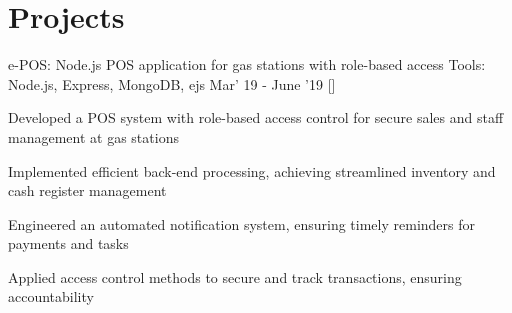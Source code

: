 











\section{\textbf{Projects}}
\vspace{-0.4mm}
\resumeSubHeadingListStart

\resumeProject
  {e-POS: Node.js POS application for gas stations with role-based access}
  {Tools: Node.js, Express, MongoDB, ejs}
  {Mar' 19 - June '19}
  {{}[\href{https://github.com/shakkhor/e-pos}{\textcolor{darkblue}{\faGithub}}]}
\resumeItemListStart
  \item Developed a POS system with role-based access control for secure sales and staff management at gas stations
  \item Implemented efficient back-end processing, achieving streamlined inventory and cash register management
  \item Engineered an automated notification system, ensuring timely reminders for payments and tasks
  \item Applied access control methods to secure and track transactions, ensuring accountability
\resumeItemListEnd

